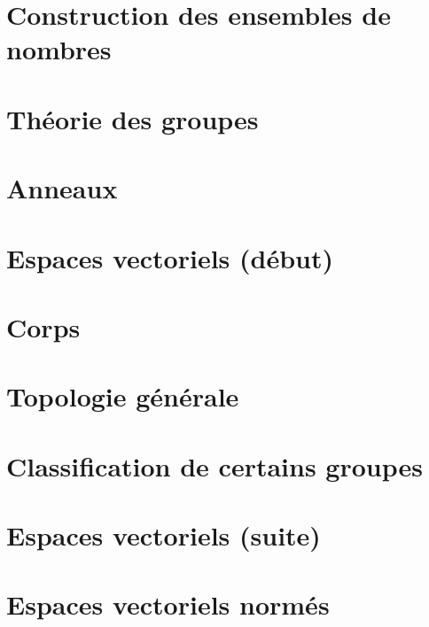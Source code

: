 \documentclass[a4paper,twoside,11pt]{book}
\begin{document}
\emptyInputPath
{}

\chapter{Construction des ensembles de nombres}


\chapter{Théorie des groupes}



\chapter{Anneaux}



\chapter{Espaces vectoriels (début)}


\chapter{Corps}




\chapter{Topologie générale}




\chapter{Classification de certains groupes}


\chapter{Espaces vectoriels (suite)}








\chapter{Espaces vectoriels normés}


\end{document}
